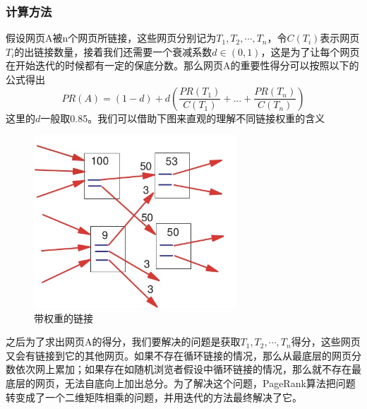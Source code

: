 \documentclass[a4paper, 14pt, twocolumn]{article}
\theoremstyle{definition}
\begin{document}
\subsubsection{计算方法}
假设网页A被n个网页所链接，这些网页分别记为$T_1,T_2,\cdots,T_n$，令$C(T_i)$表示网页$T_i$的出链接数量，接着我们还需要一个衰减系数$d \in (0,1)$，这是为了让每个网页在开始迭代的时候都有一定的保底分数。那么网页A的重要性得分可以按照以下的公式得出
\begin{equation*}
PR(A) = (1-d) + d(\frac{PR(T_1)}{C(T_1)} + ... + \frac{PR(T_n)}{C(T_n)})
\end{equation*}
这里的$d$一般取0.85。我们可以借助下图来直观的理解不同链接权重的含义
\begin{figure}[H]
\centering
\includegraphics[width=3in]{figure/PageWeight.jpg}
\caption{带权重的链接}
\end{figure}
之后为了求出网页A的得分，我们要解决的问题是获取$T_1,T_2,\cdots,T_n$得分，这些网页又会有链接到它的其他网页。如果不存在循环链接的情况，那么从最底层的网页分数依次网上累加；如果存在如随机浏览者假设中循环链接的情况，那么就不存在最底层的网页，无法自底向上加出总分。为了解决这个问题，PageRank算法把问题转变成了一个二维矩阵相乘的问题，并用迭代的方法最终解决了它。
\end{document}
